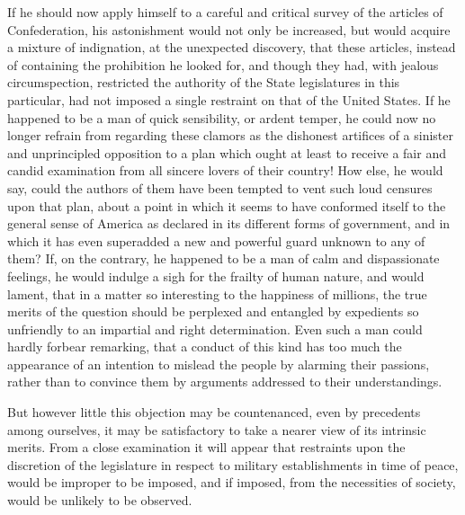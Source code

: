 If he should now apply himself to a careful and critical survey of the articles of Confederation, his astonishment would not only be increased, but would acquire a mixture of indignation, at the unexpected discovery, that these articles, instead of containing the prohibition he looked for, and though they had, with jealous circumspection, restricted the authority of the State legislatures in this particular, had not imposed a single restraint on that of the United States. If he happened to be a man of quick sensibility, or ardent temper, he could now no longer refrain from regarding these clamors as the dishonest artifices of a sinister and unprincipled opposition to a plan which ought at least to receive a fair and candid examination from all sincere lovers of their country! How else, he would say, could the authors of them have been tempted to vent such loud censures upon that plan, about a point in which it seems to have conformed itself to the general sense of America as declared in its different forms of government, and in which it has even superadded a new and powerful guard unknown to any of them? If, on the contrary, he happened to be a man of calm and dispassionate feelings, he would indulge a sigh for the frailty of human nature, and would lament, that in a matter so interesting to the happiness of millions, the true merits of the question should be perplexed and entangled by expedients so unfriendly to an impartial and right determination. Even such a man could hardly forbear remarking, that a conduct of this kind has too much the appearance of an intention to mislead the people by alarming their passions, rather than to convince them by arguments addressed to their understandings.

But however little this objection may be countenanced, even by precedents among ourselves, it may be satisfactory to take a nearer view of its intrinsic merits. From a close examination it will appear that restraints upon the discretion of the legislature in respect to military establishments in time of peace, would be improper to be imposed, and if imposed, from the necessities of society, would be unlikely to be observed.

